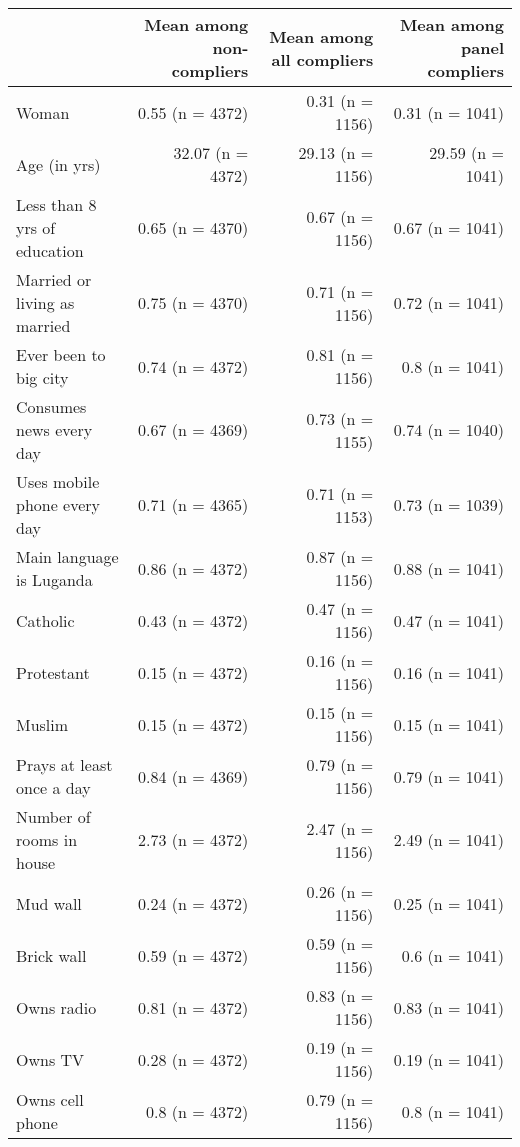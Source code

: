 
\begin{tabular}{l|r|r|r}
\hline
  & Mean among non-compliers & Mean among all compliers & Mean among panel compliers\\
\hline
Woman & 0.55 (n = 4372) & 0.31 (n = 1156) & 0.31 (n = 1041)\\
\hline
Age (in yrs) & 32.07 (n = 4372) & 29.13 (n = 1156) & 29.59 (n = 1041)\\
\hline
Less than 8 yrs of education & 0.65 (n = 4370) & 0.67 (n = 1156) & 0.67 (n = 1041)\\
\hline
Married or living as married & 0.75 (n = 4370) & 0.71 (n = 1156) & 0.72 (n = 1041)\\
\hline
Ever been to big city & 0.74 (n = 4372) & 0.81 (n = 1156) & 0.8 (n = 1041)\\
\hline
Consumes news every day & 0.67 (n = 4369) & 0.73 (n = 1155) & 0.74 (n = 1040)\\
\hline
Uses mobile phone every day & 0.71 (n = 4365) & 0.71 (n = 1153) & 0.73 (n = 1039)\\
\hline
Main language is Luganda & 0.86 (n = 4372) & 0.87 (n = 1156) & 0.88 (n = 1041)\\
\hline
Catholic & 0.43 (n = 4372) & 0.47 (n = 1156) & 0.47 (n = 1041)\\
\hline
Protestant & 0.15 (n = 4372) & 0.16 (n = 1156) & 0.16 (n = 1041)\\
\hline
Muslim & 0.15 (n = 4372) & 0.15 (n = 1156) & 0.15 (n = 1041)\\
\hline
Prays at least once a day & 0.84 (n = 4369) & 0.79 (n = 1156) & 0.79 (n = 1041)\\
\hline
Number of rooms in house & 2.73 (n = 4372) & 2.47 (n = 1156) & 2.49 (n = 1041)\\
\hline
Mud wall & 0.24 (n = 4372) & 0.26 (n = 1156) & 0.25 (n = 1041)\\
\hline
Brick wall & 0.59 (n = 4372) & 0.59 (n = 1156) & 0.6 (n = 1041)\\
\hline
Owns radio & 0.81 (n = 4372) & 0.83 (n = 1156) & 0.83 (n = 1041)\\
\hline
Owns TV & 0.28 (n = 4372) & 0.19 (n = 1156) & 0.19 (n = 1041)\\
\hline
Owns cell phone & 0.8 (n = 4372) & 0.79 (n = 1156) & 0.8 (n = 1041)\\
\hline
\end{tabular}
